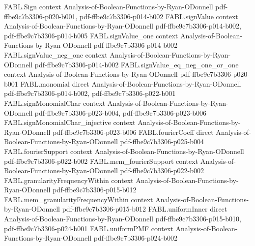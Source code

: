 \begin{theorem}
\label{FABL.tendsto_noiseSensitivity_majority_odd}
\leanok
{}
\proofstep
  {FABL.Sign}
  {context}
  {Analysis-of-Boolean-Functions-by-Ryan-ODonnell}
  {pdf-ffbe9c7b3306-p020-b001,
    pdf-ffbe9c7b3306-p014-b002}
\proofstep
  {FABL.signValue}
  {context}
  {Analysis-of-Boolean-Functions-by-Ryan-ODonnell}
  {pdf-ffbe9c7b3306-p014-b002,
    pdf-ffbe9c7b3306-p014-b005}
\proofstep
  {FABL.signValue_one}
  {context}
  {Analysis-of-Boolean-Functions-by-Ryan-ODonnell}
  {pdf-ffbe9c7b3306-p014-b002}
\proofstep
  {FABL.signValue_neg_one}
  {context}
  {Analysis-of-Boolean-Functions-by-Ryan-ODonnell}
  {pdf-ffbe9c7b3306-p014-b002}
\proofstep
  {FABL.signValue_eq_neg_one_or_one}
  {context}
  {Analysis-of-Boolean-Functions-by-Ryan-ODonnell}
  {pdf-ffbe9c7b3306-p020-b001}
\proofstep
  {FABL.monomial}
  {direct}
  {Analysis-of-Boolean-Functions-by-Ryan-ODonnell}
  {pdf-ffbe9c7b3306-p014-b002,
    pdf-ffbe9c7b3306-p022-b001}
\proofstep
  {FABL.signMonomialChar}
  {context}
  {Analysis-of-Boolean-Functions-by-Ryan-ODonnell}
  {pdf-ffbe9c7b3306-p023-b004,
    pdf-ffbe9c7b3306-p023-b006}
\proofstep
  {FABL.signMonomialChar_injective}
  {context}
  {Analysis-of-Boolean-Functions-by-Ryan-ODonnell}
  {pdf-ffbe9c7b3306-p023-b006}
\proofstep
  {FABL.fourierCoeff}
  {direct}
  {Analysis-of-Boolean-Functions-by-Ryan-ODonnell}
  {pdf-ffbe9c7b3306-p025-b004}
\proofstep
  {FABL.fourierSupport}
  {context}
  {Analysis-of-Boolean-Functions-by-Ryan-ODonnell}
  {pdf-ffbe9c7b3306-p022-b002}
\proofstep
  {FABL.mem_fourierSupport}
  {context}
  {Analysis-of-Boolean-Functions-by-Ryan-ODonnell}
  {pdf-ffbe9c7b3306-p022-b002}
\proofstep
  {FABL.granularityFrequencyWithin}
  {context}
  {Analysis-of-Boolean-Functions-by-Ryan-ODonnell}
  {pdf-ffbe9c7b3306-p015-b012}
\proofstep
  {FABL.mem_granularityFrequencyWithin}
  {context}
  {Analysis-of-Boolean-Functions-by-Ryan-ODonnell}
  {pdf-ffbe9c7b3306-p015-b012}
\proofstep
  {FABL.uniformInner}
  {direct}
  {Analysis-of-Boolean-Functions-by-Ryan-ODonnell}
  {pdf-ffbe9c7b3306-p015-b010,
    pdf-ffbe9c7b3306-p024-b001}
\proofstep
  {FABL.uniformPMF}
  {context}
  {Analysis-of-Boolean-Functions-by-Ryan-ODonnell}
  {pdf-ffbe9c7b3306-p024-b002}

\end{theorem}

